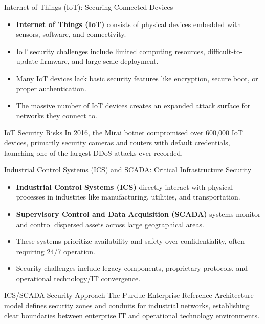 \documentclass{beamer}
\begin{document}
        \begin{frame}{Internet of Things (IoT): Securing Connected Devices}
        \begin{itemize}
        \item \textbf{Internet of Things (IoT)} consists of physical devices embedded with sensors, software, and connectivity.
        \item IoT security challenges include limited computing resources, difficult-to-update firmware, and large-scale deployment.
        \item Many IoT devices lack basic security features like encryption, secure boot, or proper authentication.
        \item The massive number of IoT devices creates an expanded attack surface for networks they connect to.
        \end{itemize}
        
        \begin{alertblock}{IoT Security Risks}
        In 2016, the Mirai botnet compromised over 600,000 IoT devices, primarily security cameras and routers with default credentials, launching one of the largest DDoS attacks ever recorded.
        \end{alertblock}
        \end{frame}
        
        \begin{frame}{Industrial Control Systems (ICS) and SCADA: Critical Infrastructure Security}
        \begin{itemize}
        \item \textbf{Industrial Control Systems (ICS)} directly interact with physical processes in industries like manufacturing, utilities, and transportation.
        \item \textbf{Supervisory Control and Data Acquisition (SCADA)} systems monitor and control dispersed assets across large geographical areas.
        \item These systems prioritize availability and safety over confidentiality, often requiring 24/7 operation.
        \item Security challenges include legacy components, proprietary protocols, and operational technology/IT convergence.
        \end{itemize}
        
        \begin{exampleblock}{ICS/SCADA Security Approach}
        The Purdue Enterprise Reference Architecture model defines security zones and conduits for industrial networks, establishing clear boundaries between enterprise IT and operational technology environments.
        \end{exampleblock}
        \end{frame}
        
\end{document}
